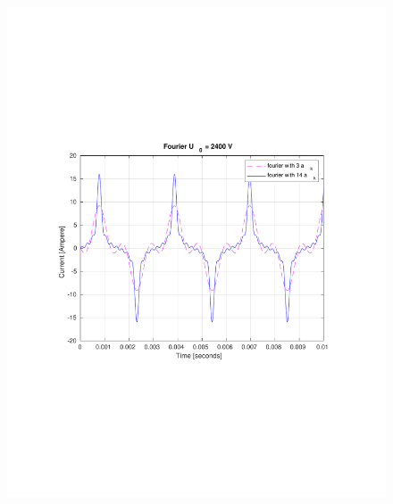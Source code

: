 \documentclass[aspectratio=1610]{beamer}
\begin{document}
\begin{frame}
\begin{columns}
\begin{figure}
				\includegraphics[scale=0.4]{figs/fourier comparison 2400.pdf}
			\end{figure}
	\end{columns}
\end{frame}
\end{document}
